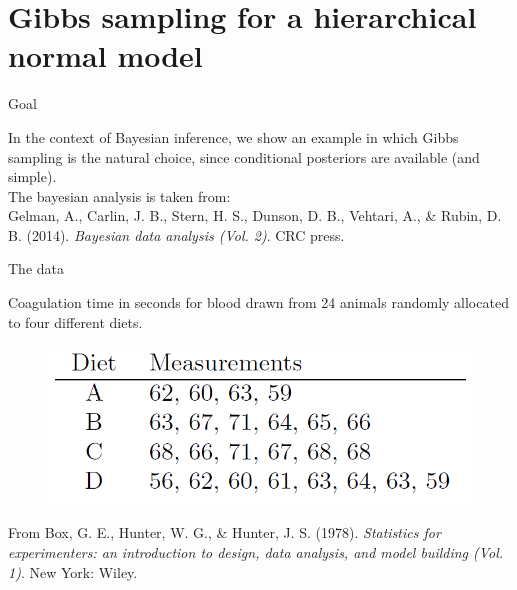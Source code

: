 \tikzset{>=latex}

\section{Gibbs sampling for a hierarchical normal model} 

\begin{frame}{Goal}

In the context of Bayesian inference, we show an example in which Gibbs sampling is the natural choice, since conditional posteriors are available (and simple).\\
\vspace{0.2in}
The bayesian analysis is taken from:\\
Gelman, A., Carlin, J. B., Stern, H. S., Dunson, D. B., Vehtari, A., \& Rubin, D. B. (2014).\textit{ Bayesian data analysis (Vol. 2)}. %
CRC press.

\end{frame}


\begin{frame}{The data}

Coagulation time in seconds for blood drawn from 24 animals randomly allocated to four different diets.\\

\begin{figure}
\centering
\includegraphics[width=0.7\columnwidth]{images/hier_data.png}
\end{figure}

From Box, G. E., Hunter, W. G., \& Hunter, J. S. (1978). \textit{Statistics for experimenters: an introduction to design, data analysis, and model building (Vol. 1)}. New York: Wiley.

\end{frame}

